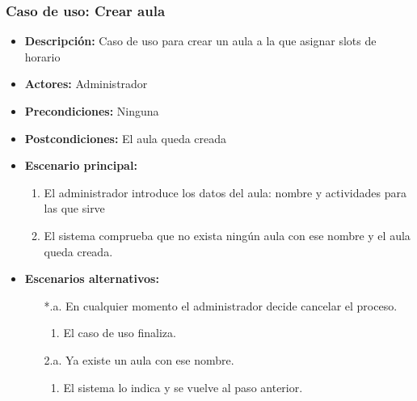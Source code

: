 \documentclass{book}
\begin{document}
\subsubsection*{Caso de uso: Crear aula}
\begin{itemize}
\item{\bf Descripción:} Caso de uso para crear un aula a la que asignar slots de horario
\item{\bf Actores:} Administrador
\item{\bf Precondiciones:} Ninguna
\item{\bf Postcondiciones:} El aula queda creada
\item{\bf Escenario principal:}
	\begin{enumerate}
	\item El administrador introduce los datos del aula: nombre y actividades para las que sirve
	\item El sistema comprueba que no exista ningún aula con ese nombre y el aula queda creada.
	\end{enumerate}
\item{\bf Escenarios alternativos:}
	\begin{itemize}
		\item[*.a.] En cualquier momento el administrador decide cancelar el proceso.
		\begin{enumerate}
			\item El caso de uso finaliza.
		\end{enumerate}
		\item[2.a.] Ya existe un aula con ese nombre.
		\begin{enumerate}
			\item El sistema lo indica y se vuelve al paso anterior.
		\end{enumerate}
	\end{itemize}
\end{itemize}
\end{document}
